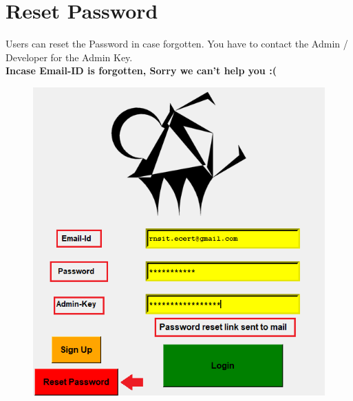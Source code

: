 \newpage

\section{Reset Password}

Users can reset the Password in case forgotten. You have to contact the Admin / Developer for the Admin Key.\\

\textbf{Incase Email-ID is forgotten, Sorry we can't help you :(} 

\begin{figure}[H]
	\centering
	\includegraphics[width=0.6\linewidth]{images/login_page/login_7}
	\label{fig:login7}
\end{figure}







